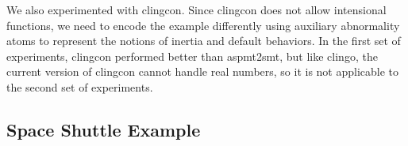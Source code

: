 \documentclass[runningheads]{llncs}
\begin{document}
We also experimented with {\sc clingcon}. Since {\sc clingcon} does
not allow intensional functions, we need to encode the example
differently using auxiliary abnormality atoms to represent the notions
of inertia and default behaviors. In the first set of experiments,
{\sc clingcon} performed better than {\sc aspmt2smt}, but
like {\sc clingo}, the current version of {\sc clingcon} cannot handle real numbers, so it is not applicable to the second set of experiments. 




\subsection{Space Shuttle Example}
\end{document}
